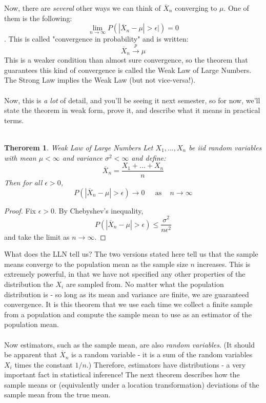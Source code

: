 \documentclass[12pt]{article} %
\newtheorem{thm}{Therorem}
\begin{document}
Now, there are \emph{several} other ways we can think of $\overline{X}_n$ converging to $\mu$. One of them is the following: 
$$\lim_{n\rightarrow\infty} P(|\overline{X}_n - \mu| > \epsilon|) = 0$$.
This is called "convergence in probability" and is written:
$$\overline{X}_n \xrightarrow{p} \mu$$
This is a weaker condition than almost sure convergence, so the theorem that guarantees this kind of convergence is called the Weak Law of Large Numbers. The Strong Law implies the Weak Law (but not vice-versa!).\\\\
Now, this is  \emph{a lot} of detail, and you'll be seeing it next semester, so for now, we'll state the theorem in weak form, prove it, and describe what it means in practical terms.\\\\
\begin{thm}{Weak Law of Large Numbers}
Let $X_1,...,X_n$ be iid random variables with mean $\mu<\infty$ and variance $\sigma^2<\infty$ and define:
$$\overline{X}_n = \frac{X_1+...+X_n}{n}$$
Then for all $\epsilon>0$,
$$P(|\overline{X}_n  - \mu|>\epsilon)\rightarrow 0 \;\;\;\; \textrm{ as } \;\;\; n\rightarrow\infty$$
\end{thm}
\begin{proof}
Fix $\epsilon>0$. By Chebyshev's inequality, 
$$P(|\overline{X}_n -\mu|>\epsilon) \leq \frac{\sigma^2}{n\epsilon^2}$$
and take the limit as $n\rightarrow\infty$.
\end{proof}
What does the LLN tell us? The two versions stated here tell us that the sample means converge to the population mean as the sample size $n$ increases. This is extremely powerful, in that we have not specified any other properties of the distribution the $X_i$ are sampled from. No matter what the population distribution is - so long as its mean and variance are finite, we are guaranteed convergence. It is this theorem that we use each time we collect a finite sample from a population and compute the sample mean to use as an estimator of the population mean.\\\\
Now estimators, such as the sample mean, are also \emph{random variables}. (It should be apparent that $\overline{X}_n$ is a random variable - it is a sum of the random variables $X_i$ times the constant $1/n$.) Therefore, estimators have distributions - a very important fact in statistical inference! The next theorem describes how the sample means or (equivalently under a location transformation) deviations of the sample mean from the true mean.
\end{document}
